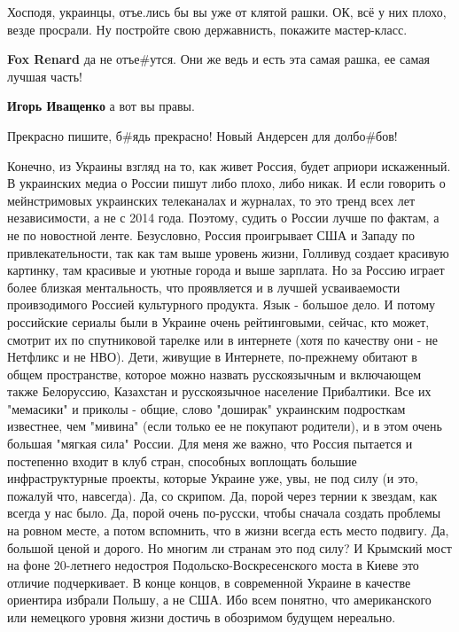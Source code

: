 \begin{itemize}
Хосподя, украинцы, отъе.лись бы вы уже от клятой рашки. ОК, всё у них плохо,
везде просрали. Ну постройте свою державнисть, покажите мастер-класс.

\begin{itemize} %
\textbf{Fox Renard} да не отъе\#утся. Они же ведь и есть эта самая рашка, ее самая лучшая часть!

\textbf{Игорь Иващенко} а вот вы правы.
\end{itemize} %

Прекрасно пишите, б\#ядь прекрасно! Новый Андерсен для долбо\#бов!


Конечно, из Украины взгляд на то, как живет Россия, будет априори искаженный. В
украинских медиа о России пишут либо плохо, либо никак. И если говорить о
мейнстримовых украинских телеканалах и журналах, то это тренд всех лет
независимости, а не с 2014 года. Поэтому, судить о России лучше по фактам, а не
по новостной ленте. Безусловно, Россия проигрывает США и Западу по
привлекательности, так как там выше уровень жизни, Голливуд создает красивую
картинку, там красивые и уютные города и выше зарплата. Но за Россию играет
более близкая ментальность, что проявляется и в лучшей усваиваемости
проивзодимого Россией культурного продукта. Язык - большое дело. И потому
российские сериалы были в Украине очень рейтинговыми, сейчас, кто может,
смотрит их по спутниковой тарелке или в интернете (хотя по качеству они - не
Нетфликс и не НВО). Дети, живущие в Интернете, по-прежнему обитают в общем
пространстве, которое можно назвать русскоязычным и включающем также
Белоруссию, Казахстан и русскоязычное население Прибалтики. Все их "мемасики" и
приколы - общие, слово "доширак" украинским подросткам известнее, чем "мивина"
(если только ее не покупают родители), и в этом очень большая "мягкая сила"
России. Для меня же важно, что Россия пытается и постепенно входит в клуб
стран, способных воплощать большие инфраструктурные проекты, которые Украине
уже, увы, не под силу (и это, пожалуй что, навсегда). Да, со скрипом. Да, порой
через тернии к звездам, как всегда у нас было. Да, порой очень по-русски, чтобы
сначала создать проблемы на ровном месте, а потом вспомнить, что в жизни всегда
есть место подвигу. Да, большой ценой и дорого. Но многим ли странам это под
силу? И Крымский мост на фоне 20-летнего недостроя Подольско-Воскресенского
моста в Киеве это отличие подчеркивает. В конце концов, в современной Украине в
качестве ориентира избрали Польшу, а не США. Ибо всем понятно, что
американского или немецкого уровня жизни достичь в обозримом будущем нереально.


\end{itemize}
